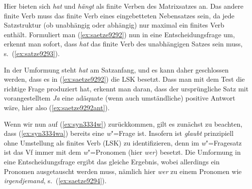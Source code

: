 \begin{exe}
\end{exe}

Hier bieten sich \textit{hat} und \textit{hängt} als finite Verben des Matrixsatzes an.
Das andere finite Verb muss das finite Verb eines eingebetteten Nebensatzes sein, da jede Satzstruktur (ob unabhängig oder abhängig) nur maximal ein finites Verb enthält.
Formuliert man (\ref{ex:saetze9292}) nun in eine Entscheidungsfrage um, erkennt man sofort, dass \textit{hat} das finite Verb des unabhängigen Satzes sein muss, s.\ (\ref{ex:satze9293}).

\begin{exe}
\end{exe}

In der Umformung steht \textit{hat} am Satzanfang, und es kann daher geschlossen werden, dass es in (\ref{ex:saetze9292}) die LSK besetzt.
Dass man mit dem Test die richtige Frage produziert hat, erkennt man daran, dass der ursprüngliche Satz mit vorangestelltem \textit{Ja} eine adäquate (wenn auch umständliche) positive Antwort wäre, hier also (\ref{ex:saetze9292ant}).

\begin{exe}
\end{exe}

Wenn wir nun auf (\ref{ex:syn3334w}) zurückkommen, gilt es zunächst zu beachten, dass (\ref{ex:syn3334wa}) bereits eine \textit{w}"=Frage ist.
Insofern ist \textit{glaubt} prinzipiell ohne Umstellung als finites Verb (LSK) zu identifizieren, denn im \textit{w}"=Fragesatz ist das Vf immer mit dem \textit{w}"=Pro\-no\-men (hier \textit{wer}) besetzt.
Die Umformung in eine Entscheidungsfrage ergibt das gleiche Ergebnis, wobei allerdings ein Pronomen ausgetauscht werden muss, nämlich hier \textit{wer} zu einem Pronomen wie \textit{irgendjemand}, s.\ (\ref{ex:saetze9294}).

\begin{exe}
\end{exe}

